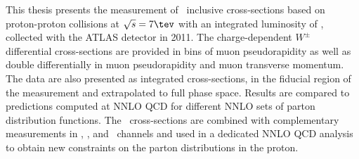 

This thesis presents the measurement of \Wmn\ inclusive cross-sections based on proton-proton collisions at $\sqrt{s}=7\tev$ with an integrated luminosity of \lumitr, collected with the ATLAS detector in 2011. The charge-dependent $W^{\pm}$ differential cross-sections are provided in bins of muon pseudorapidity as well as double differentially in muon pseudorapidity and muon transverse momentum. The data are also presented as integrated cross-sections, in the fiducial region of the measurement and extrapolated to full phase space. Results are compared to predictions computed at NNLO QCD for different NNLO sets of parton distribution functions. The \Wmn\ cross-sections are combined with complementary measurements in \Wen, \Zmm, and \Zee\ channels and used in a dedicated NNLO QCD analysis to obtain new constraints on the parton distributions in the proton.
